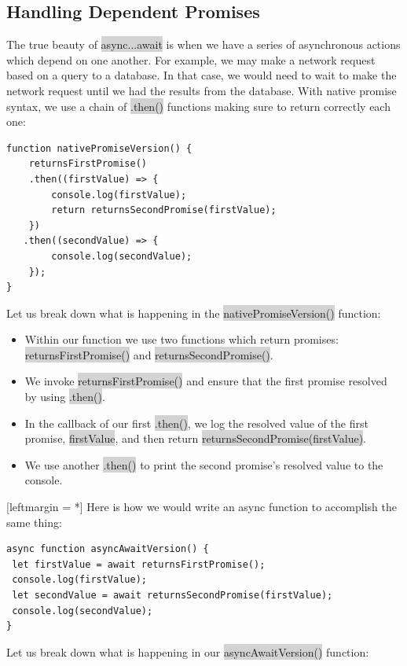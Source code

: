 \documentclass[11pt]{article}
\begin{document}
\subsection{Handling Dependent Promises}
The true beauty of \colorbox{lightgray}{async...await} is when we have a series of asynchronous actions which depend on one another. For example, we may make a network request based on a query to a database. In that case, we would need to wait to make the network request until we had the results from the database. With native promise syntax, we use a chain of  \colorbox{lightgray}{.then()} functions making sure to return correctly each one:
\begin{lstlisting}
function nativePromiseVersion() {
    returnsFirstPromise()
    .then((firstValue) => {
        console.log(firstValue);
        return returnsSecondPromise(firstValue);
    })
   .then((secondValue) => {
        console.log(secondValue);
    });
}
\end{lstlisting}
Let us break down what is happening in the \colorbox{lightgray}{nativePromiseVersion()} function:
\begin{itemize}[leftmargin = *]
\item Within our function we use two functions which return promises: \colorbox{lightgray}{returnsFirstPromise()} and \colorbox{lightgray}{returnsSecondPromise()}.
\item We invoke \colorbox{lightgray}{returnsFirstPromise()} and ensure that the first promise resolved by using \colorbox{lightgray}{.then()}.
\item In the callback of our first \colorbox{lightgray}{.then()}, we log the resolved value of the first promise, \colorbox{lightgray}{firstValue}, and then return \colorbox{lightgray}{returnsSecondPromise(firstValue)}.
\item We use another \colorbox{lightgray}{.then()} to print the second promise’s resolved value to the console.
\end{itemize}[leftmargin = *]
Here is how we would write an async function to accomplish the same thing:
\begin{lstlisting}
async function asyncAwaitVersion() {
 let firstValue = await returnsFirstPromise();
 console.log(firstValue);
 let secondValue = await returnsSecondPromise(firstValue);
 console.log(secondValue);
}
\end{lstlisting}
Let us break down what is happening in our \colorbox{lightgray}{asyncAwaitVersion()} function:
\end{document}
